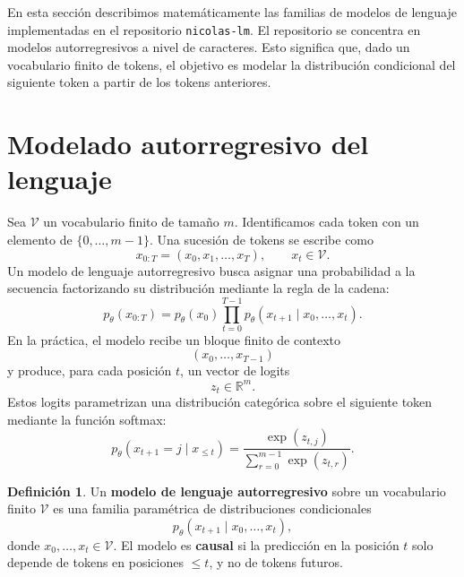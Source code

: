 \documentclass[11pt]{report}
\newenvironment{tcolorbox}[1][]{\par\medskip\noindent\ignorespaces}{\par\medskip}
\theoremstyle{definition}
\newtheorem{definicion}{Definición}[section]
\theoremstyle{plain}
\numberwithin{equation}{section}
\begin{document}
En esta sección describimos matemáticamente las familias de modelos de lenguaje implementadas en el repositorio \texttt{nicolas-lm}. El repositorio se concentra en modelos autorregresivos a nivel de caracteres. Esto significa que, dado un vocabulario finito de tokens, el objetivo es modelar la distribución condicional del siguiente token a partir de los tokens anteriores.

\section{Modelado autorregresivo del lenguaje}

Sea \(\mathcal{V}\) un vocabulario finito de tamaño \(m\). Identificamos cada token con un elemento de \(\{0,\ldots,m-1\}\). Una sucesión de tokens se escribe como
\begin{equation*}
    x_{0:T}
    =
    (x_0,x_1,\ldots,x_T),
    \qquad
    x_t\in\mathcal{V}.
\end{equation*}
Un modelo de lenguaje autorregresivo busca asignar una probabilidad a la secuencia factorizando su distribución mediante la regla de la cadena:
\begin{equation*}
    p_\theta(x_{0:T})
    =
    p_\theta(x_0)
    \prod_{t=0}^{T-1}
    p_\theta(x_{t+1}\mid x_0,\ldots,x_t).
\end{equation*}
En la práctica, el modelo recibe un bloque finito de contexto
\begin{equation*}
    (x_0,\ldots,x_{T-1})
\end{equation*}
y produce, para cada posición \(t\), un vector de logits
\begin{equation*}
    z_t\in\mathbb{R}^m.
\end{equation*}
Estos logits parametrizan una distribución categórica sobre el siguiente token mediante la función softmax:
\begin{equation*}
    p_\theta(x_{t+1}=j\mid x_{\leq t})
    =
    \frac{\exp(z_{t,j})}
    {\sum_{r=0}^{m-1}\exp(z_{t,r})}.
\end{equation*}

\begin{tcolorbox}[colback=blue!8, colframe=blue!8, boxrule=0pt]
\begin{definicion}
Un \textbf{modelo de lenguaje autorregresivo} sobre un vocabulario finito \(\mathcal{V}\) es una familia paramétrica de distribuciones condicionales
\begin{equation*}
    p_\theta(x_{t+1}\mid x_0,\ldots,x_t),
\end{equation*}
donde \(x_0,\ldots,x_t\in\mathcal{V}\). El modelo es \textbf{causal} si la predicción en la posición \(t\) solo depende de tokens en posiciones \(\leq t\), y no de tokens futuros.
\end{definicion}
\end{tcolorbox}
\end{document}
